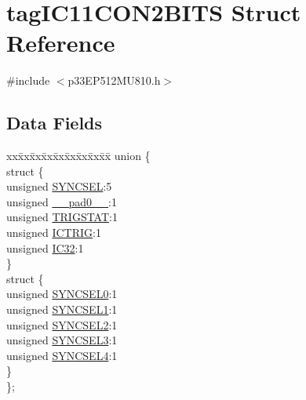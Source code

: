 \hypertarget{structtag_i_c11_c_o_n2_b_i_t_s}{}\section{tag\+I\+C11\+C\+O\+N2\+B\+I\+TS Struct Reference}
\label{structtag_i_c11_c_o_n2_b_i_t_s}


{\ttfamily \#include $<$p33\+E\+P512\+M\+U810.\+h$>$}

\subsection*{Data Fields}
\begin{DoxyCompactItemize}
\item 
\begin{tabbing}
xx\=xx\=xx\=xx\=xx\=xx\=xx\=xx\=xx\=\kill
union \{\\
\>struct \{\\
\>\>unsigned \hyperlink{structtag_i_c11_c_o_n2_b_i_t_s_a35fbbe11485c2615ed27535b62c3fa35}{SYNCSEL}:5\\
\>\>unsigned \hyperlink{structtag_i_c11_c_o_n2_b_i_t_s_adf71f3d8410c1f1dbbc96680a92c49af}{\_\_pad0\_\_}:1\\
\>\>unsigned \hyperlink{structtag_i_c11_c_o_n2_b_i_t_s_ab379549de54ac93ad4aa73686c34cb7c}{TRIGSTAT}:1\\
\>\>unsigned \hyperlink{structtag_i_c11_c_o_n2_b_i_t_s_a79bd14cfd2e403f3a96ce0b3bb58097b}{ICTRIG}:1\\
\>\>unsigned \hyperlink{structtag_i_c11_c_o_n2_b_i_t_s_afc705120246cb4ca0c93c87817519b7f}{IC32}:1\\
\>\} \\
\>struct \{\\
\>\>unsigned \hyperlink{structtag_i_c11_c_o_n2_b_i_t_s_a3b5df3154fde5141e6ac0156425ff8b4}{SYNCSEL0}:1\\
\>\>unsigned \hyperlink{structtag_i_c11_c_o_n2_b_i_t_s_a50e73f95ab1c258ddc64f69c0991deaf}{SYNCSEL1}:1\\
\>\>unsigned \hyperlink{structtag_i_c11_c_o_n2_b_i_t_s_a304907a5d2c4cbf1114a54642a85951e}{SYNCSEL2}:1\\
\>\>unsigned \hyperlink{structtag_i_c11_c_o_n2_b_i_t_s_a6bbd1bd2ead6c9fa713969c6eb0f0c75}{SYNCSEL3}:1\\
\>\>unsigned \hyperlink{structtag_i_c11_c_o_n2_b_i_t_s_a0cd5bbe196c7974953909d27a6307bb7}{SYNCSEL4}:1\\
\>\} \\
\}; \\

\end{tabbing}\end{DoxyCompactItemize}


